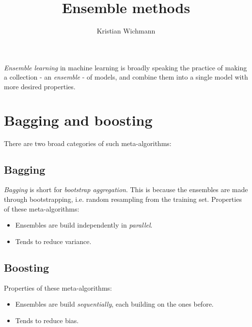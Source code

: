\documentclass[12pt, a4paper]{article}
\title{Ensemble methods}
\author{Kristian Wichmann}
\numberwithin{equation}{section}
\begin{document}
\maketitle

\textit{Ensemble learning} in machine learning is broadly speaking the practice of making a collection - an \textit{ensemble} - of models, and combine them into a single model with more desired properties.

\section{Bagging and boosting}
There are two broad categories of such meta-algorithms:

\subsection{Bagging}
\textit{Bagging} is short for \textit{bootstrap aggregation}. This is because the ensembles are made through bootstrapping, i.e. random resampling from the training set. Properties of these meta-algorithms:

\begin{itemize}
\item Ensembles are build independently in \textit{parallel}.
\item Tends to reduce variance.
\end{itemize}

\subsection{Boosting}
Properties of these meta-algorithms:
\begin{itemize}
\item Ensembles are build \textit{sequentially}, each building on the ones before.
\item Tends to reduce bias.
\end{itemize}
\end{document}
